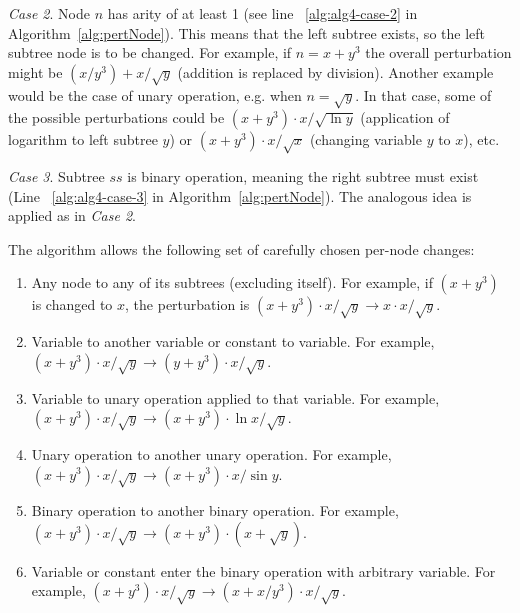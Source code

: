 \documentclass[a4paper,12pt]{elsarticle}
\begin{document}
\emph{Case 2}. 
Node $n$ has arity of at least 1 (see line ~\ref{alg:alg4-case-2} in Algorithm~\ref{alg:pertNode}). This means that the left subtree exists, so the left subtree node is to be changed. 
For example, if $n=x+y^3$ the overall perturbation might be $(x/y^3)+x/\sqrt{y}$ (addition is replaced by division). 
Another example would be the case of unary operation, e.g. when $n=\sqrt{y}$. In that case, some of the possible perturbations could be $(x+y^3)\cdot x/\sqrt{\ln{y}}$ (application of logarithm to left subtree $y$) or $(x+y^3)\cdot x/\sqrt{x}$ (changing variable $y$ to $x$), etc.

\emph{Case 3}. 
Subtree $ss$ is binary operation, meaning the right subtree must exist (Line ~\ref{alg:alg4-case-3} in Algorithm~\ref{alg:pertNode}). 
The analogous idea is applied as in \emph{Case 2}. 

The algorithm allows the following set of carefully chosen per-node changes: 

\begin{enumerate}
	\item Any node to any of its subtrees (excluding itself). For example, if $(x+y^3)$ is changed to $x$, the perturbation is $(x+y^3)\cdot x/\sqrt{y} \rightarrow x\cdot x/\sqrt{y}$. 
	\item Variable to another variable or constant to variable. For example,  $(x+y^3)\cdot x/\sqrt{y} \rightarrow (y+y^3)\cdot x/\sqrt{y}$.
	\item Variable to unary operation applied to that variable. For example,  $(x+y^3)\cdot x/\sqrt{y} \rightarrow (x+y^3)\cdot \ln{x}/\sqrt{y}$.
	\item Unary operation to another unary operation. For example,  $(x+y^3)\cdot x/\sqrt{y} \rightarrow (x+y^3)\cdot x/\sin{y}$.
	\item Binary operation to another binary operation. For example,  $(x+y^3)\cdot x/\sqrt{y} \rightarrow (x+y^3)\cdot (x + \sqrt{y})$. 
	\item Variable or constant enter the binary operation with arbitrary variable. For example,  $(x+y^3)\cdot x/\sqrt{y} \rightarrow (x+x/y^3)\cdot x/\sqrt{y}$. 
\end{enumerate} 


\end{document}
